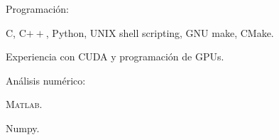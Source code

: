 \documentclass[10pt]{article}
\renewcommand{\section}[1]{\pagebreak[3]%
    \vspace{1.3\baselineskip}%
    \phantomsection\addcontentsline{toc}{section}{#1}%
    \noindent\llap{\scshape\smash{\parbox[t]{\marginparwidth}{\hyphenpenalty=10000\raggedright #1}}}%
    \vspace{-\baselineskip}\par}
\newcommand{\halfblankline}{\quad\vspace{-0.5\baselineskip}\pagebreak[3]}
\providecommand\Matlab{\textsc{Matlab}}
\begin{document}
Programación:
%
\begin{innerlist}
    \item C, C$++$, Python, UNIX shell scripting, GNU make, CMake.
    \item Experiencia con CUDA y programación de GPUs.
\end{innerlist}

\halfblankline

Análisis numérico:
%
\begin{innerlist}
    \item \Matlab.
    \item Numpy.
\end{innerlist}

%
\end{document}
